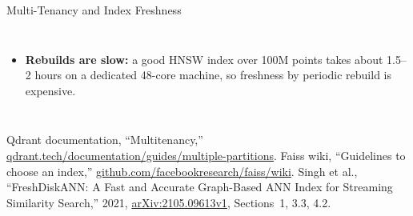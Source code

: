 \begin{frame}{Multi-Tenancy and Index Freshness}
\begin{columns}[T,onlytextwidth]
\begin{itemize}
        \item[\textcolor{red}{$\blacktriangleright$}] \textbf{Rebuilds are slow:} a good HNSW index over 100M points takes about 1.5--2 hours on a dedicated 48-core machine, so freshness by periodic rebuild is expensive.
      \end{itemize}
  \end{columns}
  \vspace{0.1em}
  {\scriptsize Qdrant documentation, ``Multitenancy,'' \href{https://qdrant.tech/documentation/guides/multiple-partitions/}{qdrant.tech/documentation/guides/multiple-partitions}. Faiss wiki, ``Guidelines to choose an index,'' \href{https://github.com/facebookresearch/faiss/wiki/Guidelines-to-choose-an-index}{github.com/facebookresearch/faiss/wiki}. Singh et al., ``FreshDiskANN: A Fast and Accurate Graph-Based ANN Index for Streaming Similarity Search,'' 2021, \href{https://arxiv.org/abs/2105.09613v1}{arXiv:2105.09613v1}, Sections~1, 3.3, 4.2.}
\end{frame}

